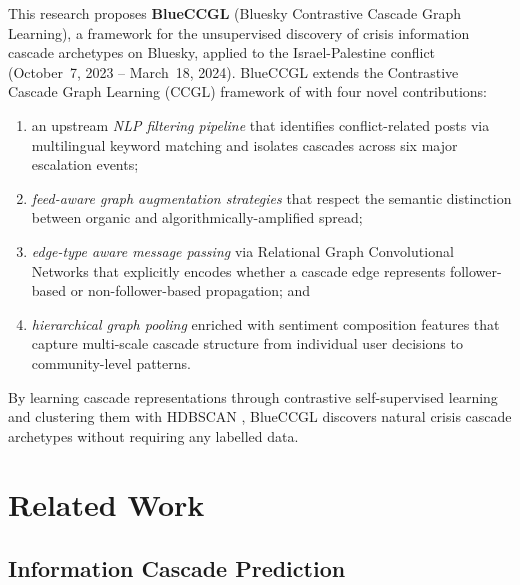 \documentclass[12pt,a4paper]{article}
\begin{document}
This research proposes \textbf{BlueCCGL} (Bluesky Contrastive Cascade Graph
Learning), a framework for the unsupervised discovery of crisis information
cascade archetypes on Bluesky, applied to the Israel-Palestine conflict
(October~7, 2023 -- March~18, 2024).  BlueCCGL extends the Contrastive Cascade
Graph Learning (CCGL) framework of \citet{xu2022ccgl} with four novel
contributions:
\begin{enumerate}[label=\textbf{(\arabic*)}]
  \item an upstream \emph{NLP filtering pipeline} that identifies
        conflict-related posts via multilingual keyword matching and isolates
        cascades across six major escalation events;
  \item \emph{feed-aware graph augmentation strategies} that respect the
        semantic distinction between organic and algorithmically-amplified
        spread;
  \item \emph{edge-type aware message passing} via Relational Graph
        Convolutional Networks \citep[R-GCN;][]{schlichtkrull2018rgcn} that
        explicitly encodes whether a cascade edge represents follower-based or
        non-follower-based propagation; and
  \item \emph{hierarchical graph pooling} \citep{ying2018diffpool} enriched
        with sentiment composition features that capture multi-scale cascade
        structure from individual user decisions to community-level patterns.
\end{enumerate}
By learning cascade representations through contrastive self-supervised learning
and clustering them with HDBSCAN \citep{mcinnes2017hdbscan}, BlueCCGL discovers
natural crisis cascade archetypes without requiring any labelled data.

\section{Related Work}

\subsection{Information Cascade Prediction}
\end{document}
